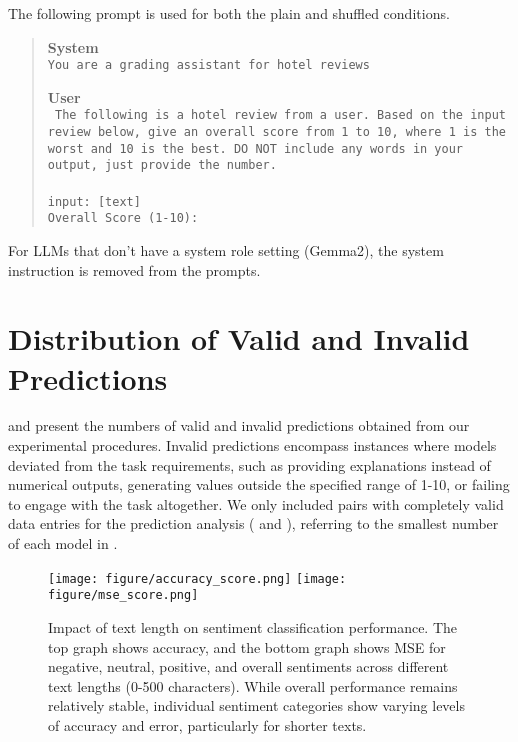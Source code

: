 The following prompt is used for both the plain and shuffled conditions.
\begin{quote}
    \small
    \textbf{System} \\
    \texttt{You are a grading assistant for hotel reviews}

    \textbf{User} \\
    \texttt{
        The following is a hotel review from a user. Based on the input review below, give an overall score from 1 to 10, where 1 is the worst and 10 is the best. DO NOT include any words in your output, just provide the number. \\ \\
        input: [text] \\
        Overall Score (1-10):
    }
\end{quote}

For LLMs that don't have a system role setting (\eg Gemma2), the system instruction is removed from the prompts.




\section{Distribution of Valid and Invalid Predictions\label{appendix:valid-sample-count}}
 and  present the numbers of valid and invalid predictions obtained from our experimental procedures.
Invalid predictions encompass instances where models deviated from the task requirements,
such as providing explanations instead of numerical outputs,
generating values outside the specified range of 1-10,
or failing to engage with the task altogether.
We only included pairs with completely valid data entries for the prediction analysis ( and ), referring to the smallest number of each model in .




\begin{figure*}
    \centering
    \texttt{[image: figure/accuracy\_score.png]}
    \texttt{[image: figure/mse\_score.png]}
    \caption{Impact of text length on sentiment classification performance. The top graph shows accuracy, and the bottom graph shows MSE for negative, neutral, positive, and overall sentiments across different text lengths (0-500 characters). While overall performance remains relatively stable, individual sentiment categories show varying levels of accuracy and error, particularly for shorter texts.}
    \label{fig:length-exp}
\end{figure*}



